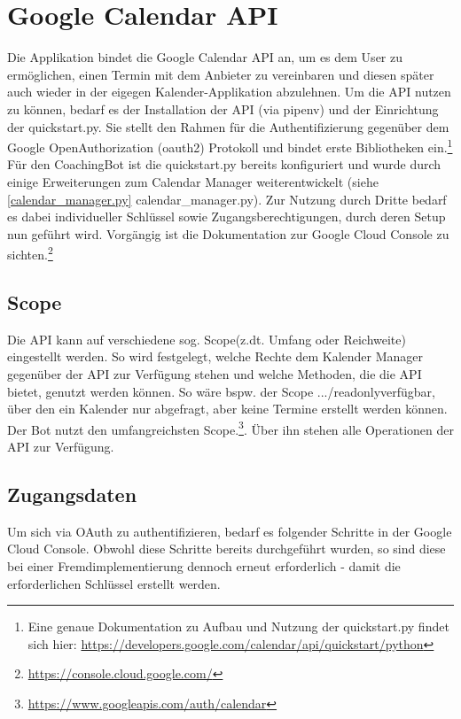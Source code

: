         
    \section{Google Calendar API} \label{Google Calendar API}
        Die Applikation bindet die Google Calendar API \cite{googleCalAPI} an, um es dem User zu ermöglichen, einen Termin mit dem Anbieter zu vereinbaren und diesen später auch wieder in der eigegen Kalender-Applikation abzulehnen.
        Um die API nutzen zu können, bedarf es der Installation der API (via pipenv) und der Einrichtung der quickstart.py. Sie stellt den Rahmen für die Authentifizierung gegenüber dem Google Open\-Authorization (oauth2) Protokoll und bindet erste Bibliotheken ein.\footnote{Eine genaue Dokumentation zu Aufbau und Nutzung der quickstart.py findet sich hier: \url{https://developers.google.com/calendar/api/quickstart/python}}
        Für den CoachingBot ist die quickstart.py bereits konfiguriert und wurde durch einige Erweiterungen zum Calendar Manager weiterentwickelt (siehe \ref{calendar_manager.py} calendar\_manager.py). Zur Nutzung durch Dritte bedarf es dabei individueller Schlüssel sowie Zugangsberechtigungen, durch deren Setup nun geführt wird. Vorgängig ist die Dokumentation zur Google Cloud Console zu sichten.\footnote{\url{https://console.cloud.google.com/}}
        
        \subsection{Scope}
            Die API kann auf verschiedene sog. \glq Scope\grq (z.dt. Umfang oder Reichweite) eingestellt werden. So wird festgelegt, welche Rechte dem Kalender Manager gegenüber der API zur Verfügung stehen und welche Methoden, die die API bietet, genutzt werden können. So wäre bspw. der Scope \glqq.../readonly\grqq verfügbar, über den ein Kalender nur abgefragt, aber keine Termine erstellt werden können. Der Bot nutzt den umfangreichsten Scope.\footnote{\url{https://www.googleapis.com/auth/calendar}}. Über ihn stehen alle Operationen der API zur Verfügung.
        
        \subsection{Zugangsdaten}
            Um sich via OAuth zu authentifizieren, bedarf es folgender Schritte in der Google Cloud Console. Obwohl diese Schritte bereits durchgeführt wurden, so sind diese bei einer Fremdimplementierung dennoch erneut erforderlich - damit die erforderlichen Schlüssel erstellt werden. 
        
